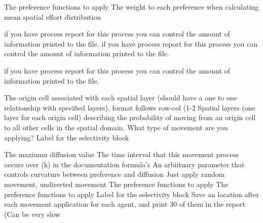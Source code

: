  {The preference functions to apply}
 {The weight to each preference when calculating mean spatial effort distribution}
\par\textbf{}\par
{} {if you have process report for this process you can control the amount of information printed to the file.}
 {if you have process report for this process you can control the amount of information printed to the file.}
\par\textbf{}\par
{} {if you have process report for this process you can control the amount of information printed to the file.}
\par\textbf{}\par
{} {The origin cell associated with each spatial layer (should have a one to one relationship with specified layers), format follows row-col (1-2}
 {Spatial layers (one layer for each origin cell) describing the probability of moving from an origin cell to all other cells in the spatial domain.}
 {What type of movement are you applying?}
 {Label for the selectivity block}
\par\textbf{}\par
{} {The maxiumu diffusion value}
 {The time interval that this movement process occurs over (k) in the documentation formula's}
 {An arbiituary parameter that controls curvature between preference and diffusion}
 {Just apply random movement, undirected movement}
 {The preference functions to apply}
 {The preference functions to apply}
 {Label for the selectivity block}
 {Save an location after each movement application for each agent, and print 30 of them in the report (Can be very slow}
\par\textbf{}\par
\par\textbf{}\par
